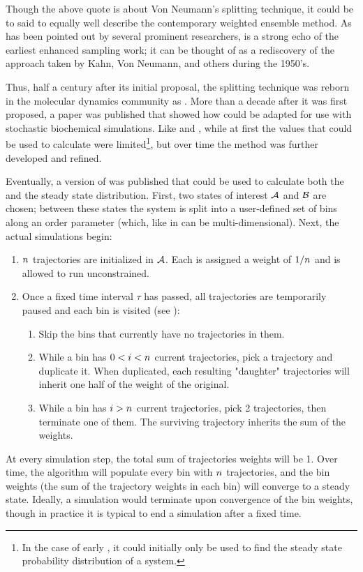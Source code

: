 Though the above quote is about Von Neumann's splitting technique, it could be to said to equally well describe the contemporary weighted ensemble  method. As has been pointed out by several prominent  researchers\supercite{Zuckerman:2017eq,Chong:2017bv},  is a strong echo of the earliest enhanced sampling work; it can be thought of as a rediscovery of the approach taken by Kahn, Von Neumann, and others during the 1950's.

Thus, half a century after its initial proposal, the splitting technique was reborn in the molecular dynamics community\supercite{Huber:1996dn} as . More than a decade after it was first proposed, a paper\supercite{Bhatt:2010df} was published that showed how  could be adapted for use with stochastic biochemical simulations. Like  and , while at first the values that  could be used to calculate were limited\footnote{In the case of early , it could initially only be used to find the steady state probability distribution of a system.}, but over time the method was further developed and refined. 

Eventually, a version of  was published that could be used to calculate both the  and the steady state distribution\supercite{Donovan:2013gz}. First, two states of interest $\mathcal{A}$ and $\mathcal{B}$ are chosen; between these states the system is split into a user-defined set of bins along an order parameter (which, like in  can be multi-dimensional). Next, the actual simulations begin:
\begin{enumerate}
    \item $n_{}$ trajectories are initialized in $\mathcal{A}$. Each is assigned a weight of $1/n_{}$ and is allowed to run unconstrained.
    \item\label{item:we_loop} Once a fixed time interval $\tau$ has passed, all trajectories are temporarily paused and each bin is visited (see ):
    \begin{enumerate}
        \item Skip the bins that currently have no trajectories in them.
        \item While a bin has $0 < i < n_{}$ current trajectories, pick a trajectory and duplicate it. When duplicated, each resulting "daughter" trajectories will inherit one half of the weight of the original.
        \item While a bin has $i > n_{}$ current trajectories, pick 2 trajectories, then terminate one of them. The surviving trajectory inherits the sum of the weights.
    \end{enumerate}
\end{enumerate}
At every simulation step, the total sum of trajectories weights will be 1. Over time, the  algorithm will populate every bin with $n_{}$ trajectories, and the bin weights (\ie the sum of the trajectory weights in each bin) will converge to a steady state. Ideally, a  simulation would terminate upon convergence of the bin weights, though in practice it is typical to end a simulation after a fixed time.

